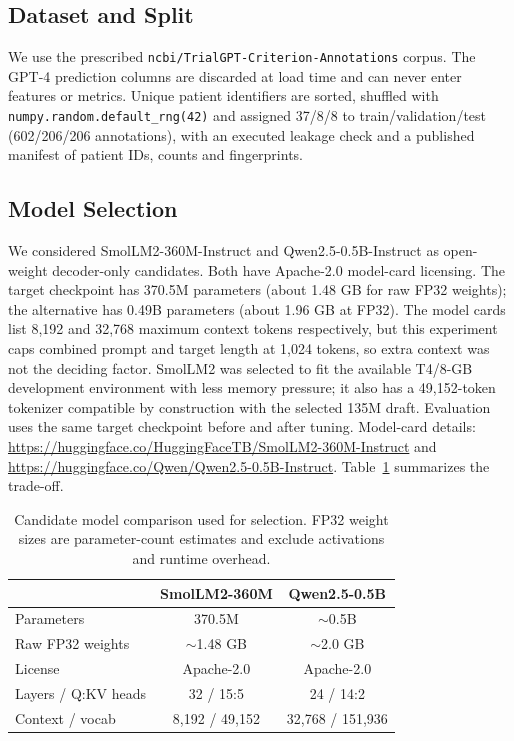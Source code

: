 \documentclass[conference]{IEEEtran}
\begin{document}
\subsection{Dataset and Split}
We use the prescribed \texttt{ncbi/TrialGPT-Criterion-Annotations} corpus. The GPT-4
prediction columns are discarded at load time and can never enter features or metrics.
Unique patient identifiers are sorted, shuffled with
\texttt{numpy.random.default\_rng(42)}
and assigned 37/8/8 to train/validation/test (602/206/206 annotations), with an executed
leakage check and a published manifest of patient IDs, counts and fingerprints.

\subsection{Model Selection}
We considered SmolLM2-360M-Instruct and Qwen2.5-0.5B-Instruct as open-weight
decoder-only candidates. Both have Apache-2.0 model-card licensing. The target
checkpoint has 370.5M parameters (about 1.48 GB for raw FP32 weights); the alternative
has 0.49B parameters (about 1.96 GB at FP32). The model cards list 8,192 and 32,768
maximum context tokens respectively, but this experiment caps combined prompt and target length at 1,024 tokens,
so extra context was not the deciding factor. SmolLM2 was selected to fit the available
T4/8-GB development environment with less memory pressure; it also has a 49,152-token
tokenizer compatible by construction with the selected 135M draft. Evaluation uses the
same target checkpoint before and after tuning. Model-card details:
\url{https://huggingface.co/HuggingFaceTB/SmolLM2-360M-Instruct} and
\url{https://huggingface.co/Qwen/Qwen2.5-0.5B-Instruct}. Table~\ref{tab:models}
summarizes the trade-off.

\begin{table}[t]
\centering
\caption{Candidate model comparison used for selection. FP32 weight sizes are
parameter-count estimates and exclude activations and runtime overhead.}
\label{tab:models}
\begin{tabular}{lcc}
\toprule
 & SmolLM2-360M & Qwen2.5-0.5B \\
\midrule
Parameters & 370.5M & $\sim$0.5B \\
Raw FP32 weights & $\sim$1.48 GB & $\sim$2.0 GB \\
License & Apache-2.0 & Apache-2.0 \\
Layers / Q:KV heads & 32 / 15:5 & 24 / 14:2 \\
Context / vocab & 8,192 / 49,152 & 32,768 / 151,936 \\
\bottomrule
\end{tabular}
\end{table}
\end{document}
